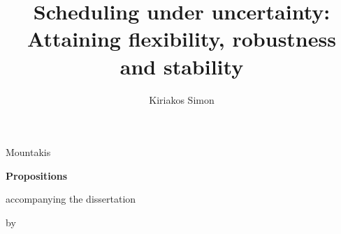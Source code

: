 \documentclass[print,nativefonts]{dissertation}
\begin{document}
\title{{Scheduling under uncertainty: Attaining flexibility, robustness and stability}}
\author{Kiriakos Simon}{Mountakis}

\begin{center}

{\Large\titlefont\bfseries Propositions}

\bigskip

accompanying the dissertation

\bigskip

{\makeatletter
\titlestyle\bfseries\large\@title
\makeatother}

{\makeatletter
\ifx\@subtitle\undefined\else
    \titlefont\titleshape\@subtitle
\fi
\makeatother}

\bigskip

by

\bigskip

\makeatletter
{\large\titlefont\bfseries\@firstname\ {\titleshape\@lastname}}
\makeatother

\end{center}

\bigskip
\bigskip
\end{document}

